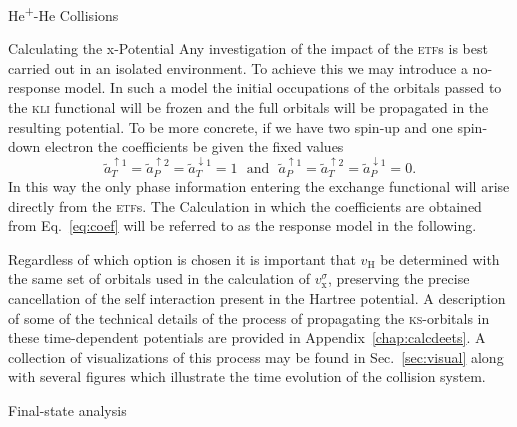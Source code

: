 \documentclass[letterpaper, 11 pt]{report}
\begin{document}
\begin{chapter}{\texorpdfstring{He\textsuperscript{+}}{He+}-He Collisions \label{chap:hephe}}
\begin{section}{Calculating the x-Potential \label{sec:pot}}
      Any investigation of the impact of the \textsc{etf}s is best carried out in an isolated
      environment. To achieve this we may introduce a no-response model. In such a model the initial
      occupations of the orbitals passed to the \textsc{kli} functional will be frozen and the full
      orbitals will be propagated in the resulting potential. To be more concrete, if we have two
      spin-up and one spin-down electron the coefficients be given the fixed values
      \begin{equation} \label{eq:noresp}
         \tilde{a}^{\uparrow 1}_T = \tilde{a}^{\uparrow 2}_P = \tilde{a}^{\downarrow 1}_T  = 1
         ~~~ \mbox{and} ~~~
         \tilde{a}^{\uparrow 1}_P = \tilde{a}^{\uparrow 2}_T = \tilde{a}^{\downarrow 1}_P  = 0.
      \end{equation}
      In this way the only phase information entering the exchange functional will arise directly from
      the \textsc{etf}s. The Calculation in which the coefficients are obtained from Eq.~\eqref{eq:coef}
      will be referred to as the response model in the following.

      Regardless of which option is chosen it is important that $v_\mathrm{H}$ be determined with the
      same set of orbitals used in the calculation of $v_\mathrm{x}^\sigma$, preserving the precise
      cancellation of the self interaction present in the Hartree potential. A description of some of
      the technical details of the process of propagating the \textsc{ks}-orbitals in these
      time-dependent potentials are provided in Appendix~\ref{chap:calcdeets}. A collection of
      visualizations of this process may be found in Sec.~\ref{sec:visual} along with several figures
      which illustrate the time evolution of the collision system.

   \end{section}

   \begin{section}{Final-state analysis \label{sec:hephe-det}}


\end{section}
\end{chapter}
\end{document}
